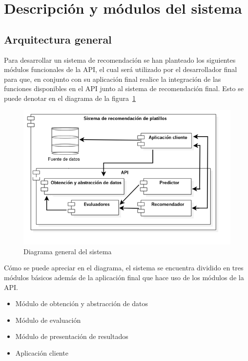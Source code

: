 \section {Descripción y módulos del sistema}

  \subsection{Arquitectura general}
    Para desarrollar un sistema de recomendación se han planteado los siguientes módulos funcionales de la API, el cual será utilizado por el desarrollador final para que, en conjunto con su aplicación final realice la integración de las funciones disponibles en el API junto al sistema de recomendación final. Esto se puede denotar en el diagrama de la figura~\ref{fig:architecture}

      \begin{figure}[h!]
      \centering
      \includegraphics[width=16cm]{./images/architecture.png}
      \caption{Diagrama general del sistema}
      \label{fig:architecture}
    \end{figure}

Cómo se puede apreciar en el diagrama, el sistema se encuentra dividido en tres módulos básicos además de la aplicación final que hace uso de los módulos de la API.
    \begin{itemize}
    \item Módulo de obtención y abstracción de datos
    \item Módulo de evaluación
    \item Módulo de presentación de resultados
    \item Aplicación cliente
  \end{itemize}

